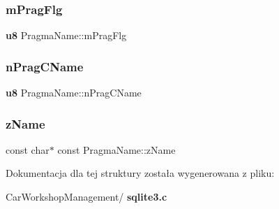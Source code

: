 \mbox{\label{struct_pragma_name_a299da7e18dfd00b25463b16062dbca09}} 
\subsubsection{mPragFlg}
{\footnotesize\ttfamily \textbf{ u8} Pragma\+Name\+::m\+Prag\+Flg}

\mbox{\label{struct_pragma_name_ab44421a7317447590f3127ad383b5715}} 
\subsubsection{nPragCName}
{\footnotesize\ttfamily \textbf{ u8} Pragma\+Name\+::n\+Prag\+C\+Name}

\mbox{\label{struct_pragma_name_ade7aeb859181f74f7b9b7a88481ed2a3}} 
\subsubsection{zName}
{\footnotesize\ttfamily const char$\ast$ const Pragma\+Name\+::z\+Name}



Dokumentacja dla tej struktury została wygenerowana z pliku\+:\begin{DoxyCompactItemize}
\item 
Car\+Workshop\+Management/\textbf{ sqlite3.\+c}\end{DoxyCompactItemize}
